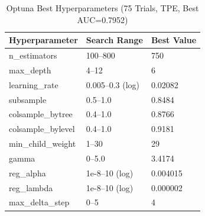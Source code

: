 \begin{table}[ht]
\centering
\caption{Optuna Best Hyperparameters (75 Trials, TPE, Best AUC=0.7952)}
\label{tab:hparams}
\begin{tabular}{lll}
\hline
Hyperparameter & Search Range & Best Value \\
\hline
n\_estimators & 100–800 & 750 \\
max\_depth & 4–12 & 6 \\
learning\_rate & 0.005–0.3 (log) & 0.02082 \\
subsample & 0.5–1.0 & 0.8484 \\
colsample\_bytree & 0.4–1.0 & 0.8766 \\
colsample\_bylevel & 0.4–1.0 & 0.9181 \\
min\_child\_weight & 1–30 & 29 \\
gamma & 0–5.0 & 3.4174 \\
reg\_alpha & 1e-8–10 (log) & 0.004015 \\
reg\_lambda & 1e-8–10 (log) & 0.000002 \\
max\_delta\_step & 0–5 & 4 \\
\hline
\end{tabular}
\end{table}